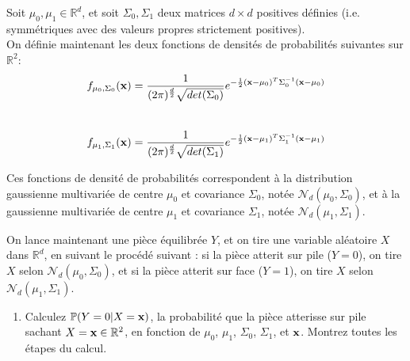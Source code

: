 \documentclass[11pt,french,english]{article}
\begin{document}
\begin{enumerate}
{Soit $\mu_{0}, \mu_{1} \in \mathbb{R}^{d}$, et soit $\Sigma_{0}, \Sigma_{1}$ deux matrices $d \times d$ positives définies (i.e. symmétriques avec des valeurs propres strictement positives). \\
On définie maintenant les deux fonctions de densités de probabilités suivantes sur $\mathbb{R}^{2}$:} \\

$$f_{\mu_{0},\Sigma_{0}}(\mathbf{x})=\frac{1}{(2\pi)^{\frac{d}{2}}\sqrt{det(\Sigma_{0})}}e^{-\frac{1}{2}(\mathbf{x}-\mu_{0})^{T}\Sigma_{0}^{-1}(\mathbf{x}-\mu_{0})}$$ \\
$$f_{\mu_{1},\Sigma_{1}}(\mathbf{x})=\frac{1}{(2\pi)^{\frac{d}{2}}\sqrt{det(\Sigma_{1})}}e^{-\frac{1}{2}(\mathbf{x}-\mu_{1})^{T}\Sigma_{1}^{-1}(\mathbf{x}-\mu_{1})}$$

{Ces fonctions de densité de probabilités correspondent à la distribution gaussienne multivariée de centre $\mu_0$ et covariance $\Sigma_0$, notée $\mathcal{N}_{d}(\mu_{0},\Sigma_{0})$, et à la gaussienne multivariée de centre $\mu_{1}$ et covariance $\Sigma_{1}$, notée $\mathcal{N}_{d}(\mu_{1},\Sigma_{1})$.}

{On lance maintenant une pièce équilibrée $Y$, et on tire une variable aléatoire $X$ dans $\mathbb{R}^{d}$, en suivant le procédé suivant : si la pièce atterit sur pile ($Y=0$), on tire $X$ selon $\mathcal{N}_{d}(\mu_{0},\Sigma_{0})$, et si la pièce atterit sur face ($Y=1$), on tire $X$ selon $\mathcal{N}_{d}(\mu_{1},\Sigma_{1})$. }

\begin{enumerate}
\item {}
{Calculez $\mathbb{P}(Y=0|X=\mathbf{x})$, la probabilité que la pièce atterisse sur pile sachant $X=\mathbf{x}\in\mathbb{R}^{2}$, en fonction de $\mu_{0}$, $\mu_{1}$, $\Sigma_{0}$, $\Sigma_{1}$, et $\mathbf{x}$.
Montrez toutes les étapes du calcul.}


\end{enumerate}
\end{enumerate}
\end{document}
